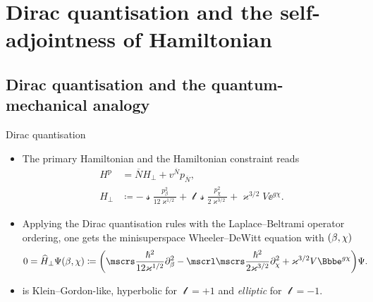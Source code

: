 \documentclass[8pt]{beamer}
\begin{document}
\section{Dirac quantisation and the self-adjointness of Hamiltonian}

\subsection{Dirac quantisation and the quantum-mechanical analogy}

\begin{frame}%
{Dirac quantisation}%
\begin{itemize}
\item
The primary Hamiltonian and the Hamiltonian
constraint reads
\begin{align}
H^\text{p} &= \overline{N}H_\perp + v^{\overline{N}} p_{\overline{N}},
\\
H_\perp &\coloneqq -\mscrs\frac{p_\beta^2}{12\varkappa^{1/2}}
+\mscrl\mscrs\frac{p_\chi^2}{2\varkappa^{3/2}}
+\varkappa^{3/2}V\ee^{g\chi}.
\end{align}
\item
Applying the Dirac quantisation rules with the Laplace--Beltrami
operator ordering, one 
gets the minisuperspace Wheeler--DeWitt equation with ${\left(\beta,\chi\right)}$
\begin{align}
0 &= \widehat{H}_\perp \rfun{\Psi}{\beta,\chi} \coloneqq
\rbr{\mscrs\frac{\hslash^2}{12\varkappa^{1/2}}\partial_{\beta}^2
-\mscrl\mscrs\frac{\hslash^2}{2\varkappa^{3/2}}\partial_{\chi}^2
+\varkappa^{3/2}V\ee^{g \chi}}\Psi.
\label{eq:WDW-10}
\end{align}
\item
{} is Klein--Gordon-like, hyperbolic for $\mscrl = +1$ and 
\emph{elliptic} for $\mscrl = -1$.
\end{itemize}
\end{frame}
\end{document}
